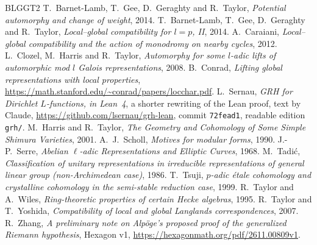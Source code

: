 \documentclass[reqno]{amsart}
\theoremstyle{definition}
\begin{document}
\begin{thebibliography}{BLGGT2}
 T.~Barnet-Lamb, T.~Gee, D.~Geraghty and R.~Taylor, \emph{Potential automorphy and change of weight}, 2014.
 T.~Barnet-Lamb, T.~Gee, D.~Geraghty and R.~Taylor, \emph{Local--global compatibility for \(l=p\), II}, 2014.
 A.~Caraiani, \emph{Local--global compatibility and the action of monodromy on nearby cycles}, 2012.
 L.~Clozel, M.~Harris and R.~Taylor, \emph{Automorphy for some \(l\)-adic lifts of automorphic mod \(l\) Galois representations}, 2008.
 B.~Conrad, \emph{Lifting global representations with local properties}, \url{https://math.stanford.edu/~conrad/papers/locchar.pdf}.
 L.~Sernau, \emph{GRH for Dirichlet \(L\)-functions, in Lean~4}, a shorter rewriting of the Lean proof, text by Claude, \url{https://github.com/lsernau/grh-lean}, commit \texttt{72fead1}, readable edition \texttt{grh/}.
 M.~Harris and R.~Taylor, \emph{The Geometry and Cohomology of Some Simple Shimura Varieties}, 2001.
 A.~J.~Scholl, \emph{Motives for modular forms}, 1990.
 J.-P.~Serre, \emph{Abelian \(\ell\)-adic Representations and Elliptic Curves}, 1968.
 M.~Tadi\'c, \emph{Classification of unitary representations in irreducible representations of general linear group (non-Archimedean case)}, 1986.
 T.~Tsuji, \emph{\(p\)-adic \'etale cohomology and crystalline cohomology in the semi-stable reduction case}, 1999.
 R.~Taylor and A.~Wiles, \emph{Ring-theoretic properties of certain Hecke algebras}, 1995.
 R.~Taylor and T.~Yoshida, \emph{Compatibility of local and global Langlands correspondences}, 2007.
 R.~Zhang, \emph{A preliminary note on Alp\"oge's proposed proof of the generalized Riemann hypothesis}, Hexagon v1, \url{https://hexagonmath.org/pdf/2611.00809v1}.
\end{thebibliography}
\end{document}
